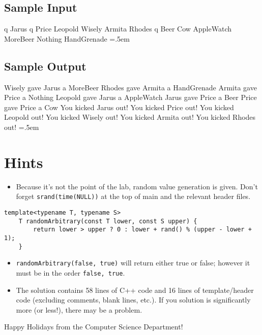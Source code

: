 \documentclass[12pt]{article}
\newcommand{\shellcmd}[1]{\texttt{\colorbox{gray!30}{#1}}}
\newenvironment{lcverbatim}
 {\SaveVerbatim{cverb}}
 {\endSaveVerbatim
  \flushleft\fboxrule=0pt\fboxsep=.5em
  \colorbox{cverbbg}{%
    \makebox[\dimexpr\linewidth-2\fboxsep][l]{\BUseVerbatim{cverb}}%
  }
  \endflushleft
}
\begin{document}
\subsection{Sample Input}
\begin{lcverbatim}
    q
    Jarus
    q
    Price
    Leopold
    Wisely
    Armita
    Rhodes
    q
    Beer
    Cow
    AppleWatch
    MoreBeer
    Nothing
    HandGrenade
\end{lcverbatim}

\subsection{Sample Output}
\begin{lcverbatim}
    Wisely gave Jarus a MoreBeer
    Rhodes gave Armita a HandGrenade
    Armita gave Price a Nothing
    Leopold gave Jarus a AppleWatch
    Jarus gave Price a Beer
    Price gave Price a Cow
    You kicked Jarus out!
    You kicked Price out!
    You kicked Leopold out!
    You kicked Wisely out!
    You kicked Armita out!
    You kicked Rhodes out!
\end{lcverbatim}

\section{Hints}
\begin{itemize}
    \item Because it's not the point of the lab, random value generation is given. Don't forget \shellcmd{srand(time(NULL))} at the top of main and the relevant header files.
\end{itemize}

\begin{lstlisting}[style=cC++]
    template<typename T, typename S>
    T randomArbitrary(const T lower, const S upper) {
        return lower > upper ? 0 : lower + rand() % (upper - lower + 1);
    }
\end{lstlisting}

\begin{itemize}
    \item \shellcmd{randomArbitrary(false, true)} will return either true or false; however it must be in the order \texttt{false, true}.

    \item The solution contains \num{58} lines of C++ code and \num{16} lines of template/header code (excluding comments, blank lines, etc.). If you solution is significantly more (or less!), there may be a problem.
\end{itemize}

\begin{center}
\noindent\Huge Happy Holidays from the Computer Science Department!
\end{center}
\end{document}
